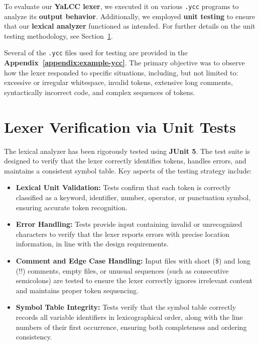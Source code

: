\documentclass{article}
\begin{document}
\noindent To evaluate our \textbf{YaLCC lexer}, we executed it on various \texttt{.ycc} programs to analyze its \textbf{output behavior}. Additionally, we employed \textbf{unit testing} to ensure that our \textbf{lexical analyzer} functioned as intended. For further details on the unit testing methodology, see Section~\ref{section:tests}.  

\noindent Several of the \texttt{.ycc} files used for testing are provided in the \textbf{Appendix~\ref{appendix:example-ycc}}. The primary objective was to observe how the lexer responded to specific situations, including, but not limited to: excessive or irregular whitespace, invalid tokens, extensive long comments, syntactically incorrect code, and complex sequences of tokens.


\section{Lexer Verification via Unit Tests}
\label{section:tests}

\noindent The lexical analyzer has been rigorously tested using \textbf{JUnit 5}. The test suite is designed to verify that the lexer correctly identifies tokens, handles errors, and maintains a consistent symbol table. Key aspects of the testing strategy include:

\begin{itemize}
    \item \textbf{Lexical Unit Validation:} Tests confirm that each token is correctly classified as a keyword, identifier, number, operator, or punctuation symbol, ensuring accurate token recognition.
    \item \textbf{Error Handling:} Tests provide input containing invalid or unrecognized characters to verify that the lexer reports errors with precise location information, in line with the design requirements.
    \item \textbf{Comment and Edge Case Handling:} Input files with short (\$) and long (!!) comments, empty files, or unusual sequences (such as consecutive semicolons) are tested to ensure the lexer correctly ignores irrelevant content and maintains proper token sequencing.
    \item \textbf{Symbol Table Integrity:} Tests verify that the symbol table correctly records all variable identifiers in lexicographical order, along with the line numbers of their first occurrence, ensuring both completeness and ordering consistency.
\end{itemize}
\end{document}

